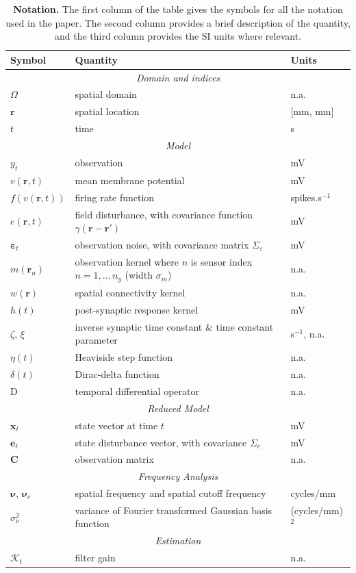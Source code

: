 \documentclass[11pt,draftcls,onecolumn,peerreview]{IEEEtran}
\begin{document}
\singlespacing
\begin{table}[!t]
\begin{tabular}{|l|l|l|}
	\hline
	\textbf{Symbol} & \textbf{Quantity} & \textbf{Units}\\
	\hline
	\multicolumn{3}{|c|}{\emph{Domain and indices}}\\
	\hline
	$\Omega$ & spatial domain & n.a.\\
	$\mathbf{r}$ & spatial location & [mm, mm]\\
	$t$ & time & s\\
	\hline
	\multicolumn{3}{|c|}{\emph{Model}}\\
	\hline
    $y_t$ & observation & mV\\
    $v(\mathbf{r},t)$ & mean membrane potential & mV \\
	$f(v\left(\mathbf{r},t\right))$ & firing rate function & spikes.s$^{-1}$\\
	$e(\mathbf{r},t)$ & field disturbance, with covariance function $\gamma(\mathbf r-\mathbf r')$ & mV\\
	$\boldsymbol\varepsilon_t$ & observation noise, with covariance matrix $\Sigma_\varepsilon$ & mV\\
	$m(\mathbf{r}_n)$ & observation kernel where $n$ is sensor index $n=1,..,n_y$ (width $\sigma_m$) & n.a. \\
	$w(\mathbf{r})$ & spatial connectivity kernel & n.a.\\
	$h(t)$ & post-synaptic response kernel & mV\\
	$\zeta$, $\xi$ & inverse synaptic time constant \& time constant parameter & s$^{-1}$, n.a.\\
	$\eta(t)$ & Heaviside step function & n.a.\\
	$\delta(t)$ & Dirac-delta function & n.a.\\
	$\textrm{D}$ & temporal differential operator & n.a.\\
	\hline
	\multicolumn{3}{|c|}{\emph{Reduced Model}} \\
	\hline
   	$\mathbf{x}_t$ & state vector at time $t$ & mV\\
   	$\mathbf{e}_t$ & state disturbance vector, with covariance $\Sigma_e$ & mV\\
   	$\mathbf{C}$ & observation matrix & n.a. \\
	\hline
	\multicolumn{3}{|c|}{\emph{Frequency Analysis}} \\
	\hline
	$\boldsymbol{\nu}$, $\boldsymbol{\nu}_c$ & spatial frequency and spatial cutoff frequency & cycles/mm \\
	$\sigma_{\nu}^2$ & variance of Fourier transformed Gaussian basis function & (cycles/mm)$^2$\\
	\hline
	\multicolumn{3}{|c|}{\emph{Estimation}} \\
	\hline
	$\mathcal K_{t} $ & filter gain & n.a.\\
	\hline
\end{tabular}
\caption{\textbf{Notation.} The first column of the table gives the symbols for all the notation used in the paper. The second column provides a brief description of the quantity, and the third column provides the SI units where relevant.}
\label{tab:Notation}
\end{table}
\doublespacing
\end{document}
